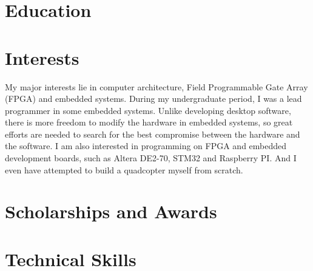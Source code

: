 \documentclass[11pt,a4paper]{moderncv}
\begin{document}
\renewcommand{\refname}{Publikationen}
\maketitle

\section{Education}
\section{Interests}
\cvline{}
{
    My major interests lie in computer architecture, Field Programmable Gate Array (FPGA) and embedded systems.
    During my undergraduate period, I was a lead programmer in some embedded systems.
    Unlike developing desktop software, there is more freedom to modify the hardware in embedded systems, so great efforts are needed to search for the best compromise between the hardware and the software.
    \newline
    I am also interested in programming on FPGA and embedded development boards, such as Altera DE2-70, STM32 and Raspberry PI.
    And I even have attempted to build a quadcopter myself from scratch.
}

\section{Scholarships and Awards}

\section{Technical Skills}
\end{document}
